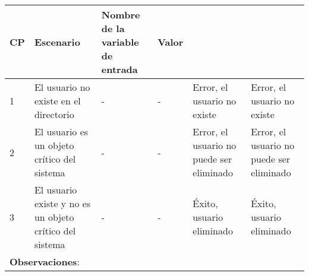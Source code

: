\begin{longtable}{|p{2cm}|p{2.5cm}|p{2.5cm}|p{2.5cm}|p{2.5cm}|p{2.5cm}|}
    \textbf{CP}                                                        & \textbf{Escenario}                                                                                                                                                                                & \textbf{Nombre de la variable de entrada} & \textbf{Valor} &                                          &                                          \\ \hline
    1                                                                  & El usuario no existe en el directorio                                                                                                                                                             & -                                         & -              & Error, el usuario no existe              & Error, el usuario no existe              \\ \hline
    2                                                                  & El usuario es un objeto crítico del sistema                                                                                                                                                       & -                                         & -              & Error, el usuario no puede ser eliminado & Error, el usuario no puede ser eliminado \\ \hline
    3                                                                  & El usuario existe y no es un objeto crítico del sistema                                                                                                                                           & -                                         & -              & Éxito, usuario eliminado                 & Éxito, usuario eliminado                 \\ \hline
    \multicolumn{6}{|l|}{\textbf{Observaciones}: }                                                                                                                                                                                                                                                                                                                                                                            \\ \hline
\end{longtable}


